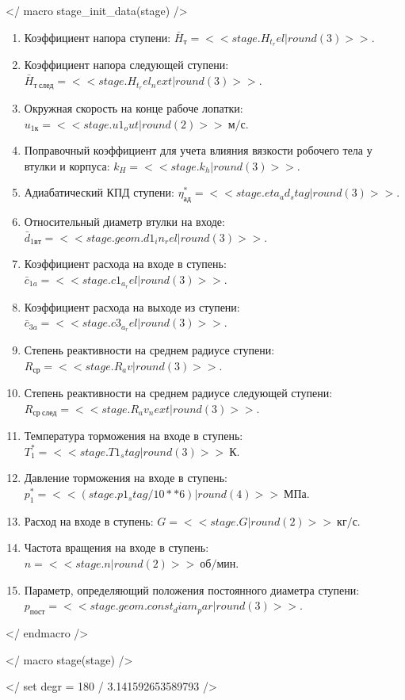 \documentclass[a4paper,10pt]{article}
\begin{document}
    </ macro stage_init_data(stage) />
    \begin{enumerate}

        \item Коэффициент напора ступени: $\bar{H}_{т} = << stage.H_t_rel | round(3) >>$.
        \item Коэффициент напора следующей ступени: $ \bar{H}_{т\ след} = << stage.H_t_rel_next | round(3) >>$.
        \item Окружная скорость на конце рабоче лопатки: $ u_{1к} = << stage.u1_out | round(2) >>\ м/с $.
        \item Поправочный коэффициент для учета влияния вязкости робочего тела у втулки и корпуса: $ k_H = << stage.k_h | round(3) >> $.
        \item Адиабатический КПД ступени: $ \eta_{ад}^* = << stage.eta_ad_stag | round(3) >> $.
        \item Относительный диаметр втулки на входе: $ \bar{d}_{1вт} = << stage.geom.d1_in_rel | round(3) >> $.
        \item Коэффициент расхода на входе в ступень: $ \bar{c}_{1a} = << stage.c1_a_rel | round(3) >> $.
        \item Коэффициент расхода на выходе из ступени: $ \bar{c}_{3a} = << stage.c3_a_rel | round(3) >> $.
        \item Степень реактивности на среднем радиусе ступени: $ R_{ср} = << stage.R_av | round(3) >> $.
        \item Степень реактивности на среднем радиусе следующей ступени: $ R_{ср\ след} = << stage.R_av_next | round(3) >> $.
        \item Температура торможения на входе в ступень: $ T_1^* = << stage.T1_stag | round(3) >>\ К $.
        \item Давление торможения на входе в ступень: $ p_1^* = << (stage.p1_stag / 10**6) | round(4) >>\ МПа $.
        \item Расход на входе в ступень: $ G = << stage.G | round(2) >>\ кг/с $.
        \item Частота вращения на входе в ступень: $ n = << stage.n | round(2) >>\ об/мин $.
        \item Параметр, определяющий положения постоянного диаметра ступени: $ p_{пост} = << stage.geom.const_diam_par | round(3) >> $.


    \end{enumerate}
    </ endmacro />

    </ macro stage(stage) />

    </ set degr = 180 / 3.141592653589793 />
\end{document}
